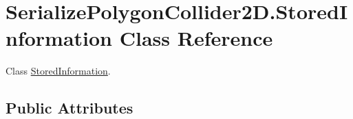 \hypertarget{class_serialize_polygon_collider2_d_1_1_stored_information}{}\section{Serialize\+Polygon\+Collider2\+D.\+Stored\+Information Class Reference}
\label{class_serialize_polygon_collider2_d_1_1_stored_information}


Class \hyperlink{class_serialize_polygon_collider2_d_1_1_stored_information}{Stored\+Information}.  


\subsection*{Public Attributes}
